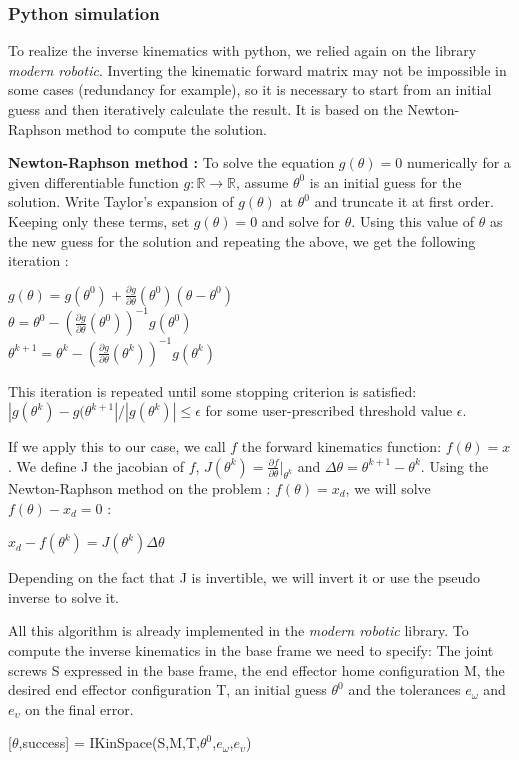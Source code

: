 \subsubsection{Python simulation}

To realize the inverse kinematics with python, we relied again on the library \textit{modern robotic}. Inverting the kinematic forward matrix may not be impossible in some cases (redundancy for example), so it is necessary to start from an initial guess and then iteratively calculate the result. It is based on the Newton-Raphson method to compute the solution. 

\bigbreak
\textbf{Newton-Raphson method :} To solve the equation $g(\theta)=0$ numerically for a given differentiable function $g:\mathbb{R}\rightarrow\mathbb{R}$, assume $\theta^0$ is an initial guess for the solution. Write Taylor's expansion of $g(\theta)$ at $\theta^0$ and truncate it at first order. Keeping only these terms, set $g(\theta)=0$ and solve for $\theta$. Using this value of $\theta$ as the new guess for the solution and repeating the above, we get the following iteration : 
\begin{center}
    $g(\theta) = g(\theta^0)+\displaystyle{\frac{\partial g}{\partial\theta}(\theta^0)(\theta-\theta^0)}$\\
    $\theta = \theta^0-\displaystyle{(\frac{\partial g}{\partial\theta}(\theta^0))^{-1}g(\theta^0)}$\\
    $\theta^{k+1} = \theta^k-\displaystyle{(\frac{\partial g}{\partial\theta}(\theta^k))^{-1}g(\theta^k)}$
\end{center}
 This iteration is repeated until some stopping criterion is satisfied: $|g(\theta^k)-g(\theta^{k+1}|/|g(\theta^k)|\leq\epsilon$ for some user-prescribed threshold value $\epsilon$.
 
 \bigbreak
 If we apply this to our case, we call $f$ the forward kinematics function: $f(\theta) = x$. We define J the jacobian of $f$, $J(\theta^k)= \displaystyle{\frac{\partial f}{\partial\theta}|_{\theta^k}}$ and $\Delta\theta = \theta^{k+1}-\theta^k$. Using the Newton-Raphson method on the problem : $f(\theta)=x_d$, we will solve $f(\theta)-x_d=0$ :
 \begin{center}
     $x_d-f(\theta^k)=J(\theta^k)\Delta\theta$
 \end{center}
 Depending on the fact that J is invertible, we will invert it or use the pseudo inverse to solve it. 
 
 \bigbreak
 All this algorithm is already implemented in the \textit{modern robotic} library. To compute the inverse kinematics in the base frame we need to specify: The joint screws S expressed in the base frame, the end effector home configuration M, the desired end effector configuration T, an initial guess $\theta^0$ and the tolerances $e_\omega$ and $e_\upsilon$ on the final error.
 \begin{center}
     [$\theta$,success] = IKinSpace(S,M,T,$\theta^0$,$e_\omega$,$e_\upsilon$)
 \end{center}
 
